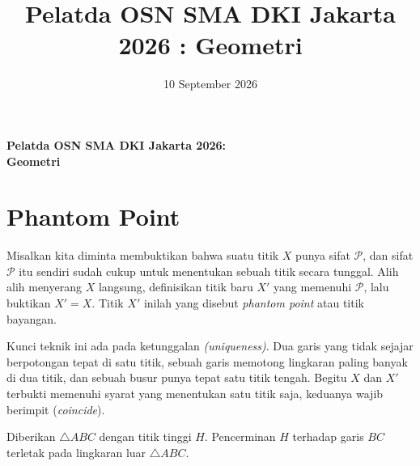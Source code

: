 \documentclass[letterpaper, 13pt]{scrartcl}
\title{Pelatda OSN SMA DKI Jakarta 2026 : Geometri}
\date{10 September 2026}
\newcommand{\titik}[1]{\foreach \p in {#1} \filldraw (\p) circle (1.4pt);}
\begin{document}
\textbf{\Huge Pelatda OSN SMA DKI Jakarta 2026: \\  Geometri}

\renewcommand*\contentsname{Daftar Isi}
\tableofcontents

\section{Phantom Point}

\begin{definition*}
Misalkan kita diminta membuktikan bahwa suatu titik $X$ punya sifat $\mathcal{P}$, dan sifat $\mathcal{P}$ itu sendiri sudah cukup untuk menentukan sebuah titik secara tunggal. Alih alih menyerang $X$ langsung, definisikan titik baru $X'$ yang memenuhi $\mathcal{P}$, lalu buktikan $X' = X$. Titik $X'$ inilah yang disebut \emph{phantom point} atau titik bayangan.
\end{definition*}

Kunci teknik ini ada pada ketunggalan \textit{(uniqueness)}. Dua garis yang tidak sejajar berpotongan tepat di satu titik, sebuah garis memotong lingkaran paling banyak di dua titik, dan sebuah busur punya tepat satu titik tengah. Begitu $X$ dan $X'$ terbukti memenuhi syarat yang menentukan satu titik saja, keduanya wajib berimpit (\textit{coincide}).

\noindent
\begin{minipage}[t]{175pt}
\vspace{0pt}
\centering
{}
\end{minipage}\hfill
\begin{minipage}[t]{\dimexpr\textwidth-175pt-16pt\relax}
\vspace{0pt}
\begin{lemma*}
Diberikan $\triangle ABC$ dengan titik tinggi $H$. Pencerminan $H$ terhadap garis $BC$ terletak pada lingkaran luar $\triangle ABC$.
\end{lemma*}
\end{minipage}
\par\bigskip
\end{document}
